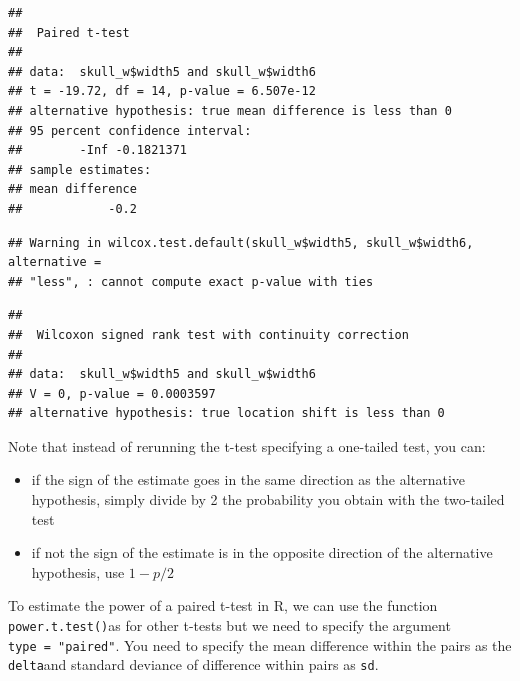 \documentclass[
  12pt,
]{book}
\makeatletter
\newenvironment{Shaded}{\begin{snugshade}}{\end{snugshade}}
\newcommand{\DataTypeTok}[1]{\textcolor[rgb]{0.13,0.29,0.53}{#1}}
\newcommand{\KeywordTok}[1]{\textcolor[rgb]{0.13,0.29,0.53}{\textbf{#1}}}
\newcommand{\NormalTok}[1]{#1}
\newcommand{\OperatorTok}[1]{\textcolor[rgb]{0.81,0.36,0.00}{\textbf{#1}}}
\newcommand{\OtherTok}[1]{\textcolor[rgb]{0.56,0.35,0.01}{#1}}
\newcommand{\StringTok}[1]{\textcolor[rgb]{0.31,0.60,0.02}{#1}}
\providecommand{\tightlist}{%
  \setlength{\itemsep}{0pt}\setlength{\parskip}{0pt}}
\newenvironment{kframe}{%
\medskip{}
\setlength{\fboxsep}{.8em}
\def\at@end@of@kframe{}%
\ifinner\ifhmode%
 \def\at@end@of@kframe{\end{minipage}}%
 \begin{minipage}{\columnwidth}%
\fi\fi%
\def\FrameCommand##1{\hskip\@totalleftmargin \hskip-\fboxsep
\colorbox{incolor}{##1}\hskip-\fboxsep
    \hskip-\linewidth \hskip-\@totalleftmargin \hskip\columnwidth}%
\MakeFramed {\advance\hsize-\width
  \@totalleftmargin\z@ \linewidth\hsize
  \@setminipage}}%
{\par\unskip\endMakeFramed%
\at@end@of@kframe}
\newenvironment{rmdblock}[1]
 {
 \begin{itemize}
 \renewcommand{\labelitemi}{
   \raisebox{-.7\height}[0pt][0pt]{
     {\setkeys{Gin}{width=3em,keepaspectratio}\texttt{[image: images/\#1]}}
   }
 }
 \begin{kframe}
 \setlength{\fboxsep}{1em}
 \item
 }
 {
 \end{kframe}
 \end{itemize}
 }
\newenvironment{rmdwarning}
  {\begin{rmdblock}{warning}}
  {\end{rmdblock}}
\makeatother
\begin{document}
\begin{verbatim}
## 
##  Paired t-test
## 
## data:  skull_w$width5 and skull_w$width6
## t = -19.72, df = 14, p-value = 6.507e-12
## alternative hypothesis: true mean difference is less than 0
## 95 percent confidence interval:
##        -Inf -0.1821371
## sample estimates:
## mean difference 
##            -0.2
\end{verbatim}

\begin{Shaded}
\end{Shaded}

\begin{verbatim}
## Warning in wilcox.test.default(skull_w$width5, skull_w$width6, alternative =
## "less", : cannot compute exact p-value with ties
\end{verbatim}

\begin{verbatim}
## 
##  Wilcoxon signed rank test with continuity correction
## 
## data:  skull_w$width5 and skull_w$width6
## V = 0, p-value = 0.0003597
## alternative hypothesis: true location shift is less than 0
\end{verbatim}

\begin{rmdwarning}
Note that instead of rerunning the t-test specifying a one-tailed test, you can:

\begin{itemize}
\tightlist
\item
  if the sign of the estimate goes in the same direction as the alternative hypothesis, simply divide by 2 the probability you obtain with the two-tailed test
\item
  if not the sign of the estimate is in the opposite direction of the alternative hypothesis, use \(1 - p/2\)
\end{itemize}
\end{rmdwarning}

To estimate the power of a paired t-test in R, we can use the function \texttt{power.t.test()}as for other t-tests but we need to specify the argument \texttt{type\ =\ "paired"}.
You need to specify the mean difference within the pairs as the \texttt{delta}and standard deviance of difference within pairs as \texttt{sd}.
\end{document}
